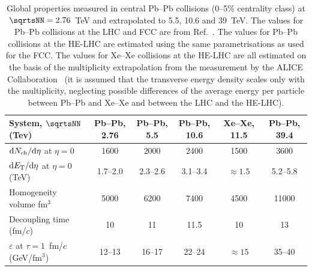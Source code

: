 \documentclass[../report.tex]{subfiles}
\begin{document}
\begin{table}[!t]
\caption{Global properties measured in central Pb--Pb collisions (0--5\% centrality class) at $\sqrtsNN=2.76$~TeV and extrapolated to 5.5, 10.6 and 39~TeV. The values for Pb--Pb collisions at the LHC and FCC are from Ref.~\cite{Dainese:2016gch}. The values for Pb--Pb collisions at the HE-LHC are estimated using the same parametrisations as used for the FCC. The values for Xe--Xe collisions at the HE-LHC are all estimated on the basis of the multiplicity extrapolation from the measurement by the ALICE Collaboration~\cite{Acharya:2018hhy} (it is assumed that the transverse energy density scales only with the multiplicity, neglecting possible differences of the average energy per particle between Pb--Pb and Xe--Xe and between the LHC and the HE-LHC).}
\small
\begin{center}
\begin{tabular}{lccccc}
\hline
System, $\sqrtsNN$ (Tev) & Pb--Pb, 2.76 & Pb--Pb, 5.5 & Pb--Pb, 10.6 & Xe--Xe, 11.5 & Pb--Pb, 39.4 \\
\hline
${\rm d}N_{\rm ch}/{\rm d}\eta$ at $\eta=0$ & 1600 & 2000 & 2400 & 1500  & 3600 \\
${\rm d}E_{\rm T}/{\rm d}\eta$ at $\eta=0$ (TeV) & 1.7--2.0 & 2.3--2.6 & 3.1--3.4 & $\approx 1.5$ &  5.2--5.8 \\
Homogeneity volume fm$^3$ & 5000  & 6200 & 7400 & 4500 & 11000 \\
Decoupling time (fm/$c$) & 10 &  11 & 11.5 & 10 & 13 \\
$\varepsilon$ at $\tau=1$~fm/$c$ (GeV/fm$^3$) & 12--13  & 16--17 & 22--24 & $\approx 15$ & 35--40 \\
\hline
\end{tabular}
\end{center}
\label{tab:PbPb}
\end{table}




 
\end{document}
